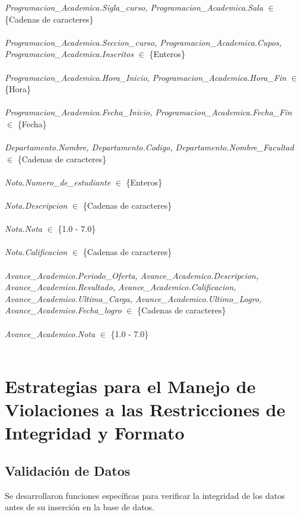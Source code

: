 \documentclass[12pt]{article}
\begin{document}
\textit{Programacion\_Academica.Sigla\_curso, Programacion\_Academica.Sala} $\in$ \{Cadenas de caracteres\}\\\\
\textit{Programacion\_Academica.Seccion\_curso, Programacion\_Academica.Cupos, Programacion\_Academica.Inscritos} $\in$ \{Enteros\}\\\\
\textit{Programacion\_Academica.Hora\_Inicio, Programacion\_Academica.Hora\_Fin} $\in$ \{Hora\}\\\\
\textit{Programacion\_Academica.Fecha\_Inicio, Programacion\_Academica.Fecha\_Fin} $\in$ \{Fecha\}\\\\
\textit{Departamento.Nombre, Departamento.Codigo, Departamento.Nombre\_Facultad} $\in$ \{Cadenas de caracteres\}\\\\
\textit{Nota.Numero\_de\_estudiante} $\in$ \{Enteros\}\\\\
\textit{Nota.Descripcion} $\in$ \{Cadenas de caracteres\}\\\\
\textit{Nota.Nota} $\in$ \{1.0 - 7.0\}\\\\
\textit{Nota.Calificacion} $\in$ \{Cadenas de caracteres\}\\\\
\textit{Avance\_Academico.Periodo\_Oferta, Avance\_Academico.Descripcion, Avance\_Academico.Resultado, Avance\_Academico.Calificacion, Avance\_Academico.Ultima\_Carga, Avance\_Academico.Ultimo\_Logro, Avance\_Academico.Fecha\_logro} $\in$ \{Cadenas de caracteres\}\\\\
\textit{Avance\_Academico.Nota} $\in$ \{1.0 - 7.0\}\\\\


\section*{Estrategias para el Manejo de Violaciones a las Restricciones de Integridad y Formato}

\subsection*{Validación de Datos}
Se desarrollaron funciones específicas para verificar la integridad de los datos antes de su inserción en la base de datos.
\end{document}
